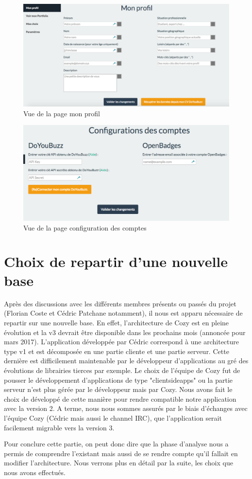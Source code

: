 \begin{figure}[!ht]
\begin{center}
\includegraphics[scale = 0.3]{img/mon-profil.png}
\end{center}
\caption{Vue de la page mon profil}
\label{fig:vueProfil} 
\end{figure}

\begin{figure}[!ht]
\begin{center}
\includegraphics[scale = 0.3]{img/config-comptes.png}
\end{center}
\caption{Vue de la page configuration des comptes}
\label{fig:vueConfigCompte} 
\end{figure}

\section{Choix de repartir d'une nouvelle base}

Après des discussions avec les différents membres présents ou passés du projet (Florian Coste et Cédric Patchane notamment), il nous est apparu nécessaire de repartir sur une nouvelle base. En effet, l'architecture de Cozy est en pleine évolution et la v3 devrait être disponible dans les prochains mois (annoncée pour mars 2017). L'application développée par Cédric correspond à une architecture type v1 et est décomposée en une partie cliente et une partie serveur. Cette dernière est difficilement maintenable par le développeur d'applications au gré des évolutions de librairies tierces par exemple. Le choix de l'équipe de Cozy fut de pousser le développement d'applications de type "clientsideapps" ou la partie serveur n'est plus gérée par le développeur mais par Cozy. Nous avons fait le choix de développé de cette manière pour rendre compatible notre application avec la version 2. A terme, nous nous sommes assurés par le biais d'échanges avec l'équipe Cozy (Cédric mais aussi le channel IRC), que l'application serait facilement migrable vers la version 3. 

Pour conclure cette partie, on peut donc dire que la phase d'analyse nous a permis de comprendre l'existant mais aussi de se rendre compte qu'il fallait en modifier l'architecture. Nous verrons plus en détail par la suite, les choix que nous avons effectués. 


